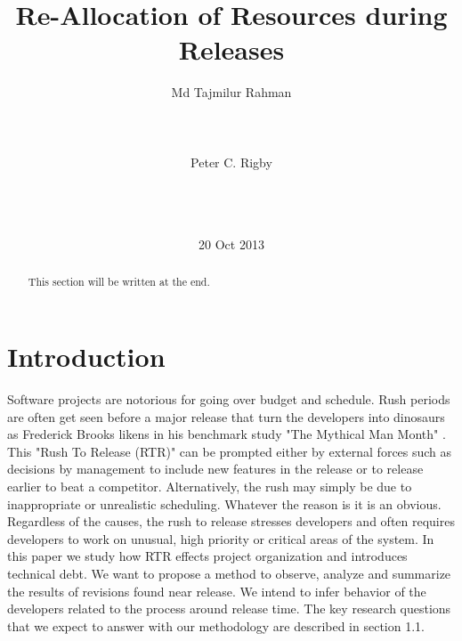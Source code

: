 \documentclass{acm_proc_article-sp}
\begin{document}
\title{Re-Allocation of Resources during Releases }
\author{
\alignauthor
Md Tajmilur Rahman\\
       \\
       \\
       \\
\alignauthor
Peter C. Rigby\\
       \\
       \\
       \\
}
\date{20 Oct 2013}
\maketitle
\begin{abstract}
This section will be written at the end.
\end{abstract}
\section{Introduction}
Software projects are notorious for going over budget and schedule. Rush periods are often get seen before a major release that turn the developers into dinosaurs as Frederick Brooks likens in his benchmark study "The Mythical Man Month" \cite{brooks_mythical}. This "Rush To Release (RTR)" can be prompted either by external forces such as decisions by management to include new features in the release or to release earlier to beat a competitor. Alternatively, the rush may simply be due to inappropriate or unrealistic scheduling. Whatever the reason is it is an obvious. Regardless of the causes, the rush to release stresses developers and often requires developers to work on unusual, high priority or critical areas of the system. In this paper we study how RTR effects project organization and introduces technical debt. We want to propose a method to observe, analyze and summarize the results of revisions found near release. We intend to infer behavior of the developers related to the process around release time. The key research questions that we expect to answer with our methodology are described in section 1.1.
\end{document}
